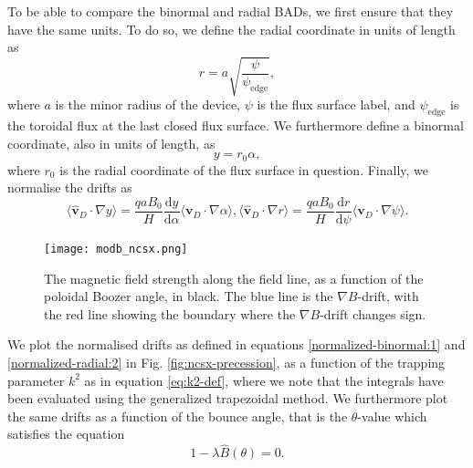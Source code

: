 To be able to compare the binormal and radial BADs, we first ensure that they have the same units. To do so, we define the radial coordinate in units of length as
\begin{equation}
    r = a \sqrt{\frac{\psi}{\psi_\mathrm{edge}}},
\end{equation}
where $a$ is the minor radius of the device, $\psi$ is the flux surface label, and $\psi_\mathrm{edge}$ is the toroidal flux at the last closed flux surface. We furthermore define a binormal coordinate, also in units of length, as
\begin{equation}
    y = r_0 \alpha,
\end{equation}
where $r_0$ is the radial coordinate of the flux surface in question. Finally, we normalise the drifts as
\begin{subequations}
\label{eq:whole}
\begin{equation}
\langle \hat{\mathbf{v}}_D \cdot \nabla y \rangle = \frac{q a B_0}{H} \frac{\mathrm{d} y}{\mathrm{d} \alpha} \langle \mathbf{v}_D \cdot \nabla \alpha \rangle,\label{normalized-binormal:1}
\end{equation}
\begin{equation}
\langle \hat{\mathbf{v}}_D \cdot \nabla r \rangle =  \frac{q a B_0}{H} \frac{\mathrm{d} r}{\mathrm{d} \psi} \langle \mathbf{v}_D \cdot \nabla \psi \rangle \label{normalized-radial:2}.
\end{equation}
\end{subequations} \par
\begin{figure}
\texttt{[image: modb\_ncsx.png]}%
\caption{\label{fig:ncsx-modb} The magnetic field strength along the field line, as a function of the poloidal Boozer angle, in black. The blue line is the $\nabla B$-drift, with the red line showing the boundary where the $\nabla B$-drift changes sign.} 
\end{figure}
We plot the normalised drifts as defined in equations \eqref{normalized-binormal:1} and \eqref{normalized-radial:2} in Fig. \ref{fig:ncsx-precession}, as a function of the trapping parameter $k^2$ as in equation \eqref{eq:k2-def}, where we note that the integrals have been evaluated using the generalized trapezoidal method. We furthermore plot the same drifts as a  function of the bounce angle, that is the $\theta$-value which satisfies the equation 
\begin{equation}
    1-\lambda \hat{B}(\theta) = 0.
\end{equation}
